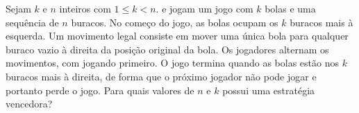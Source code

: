 Sejam $k$ e $n$ inteiros com $1\leq k<n$.  e  jogam um jogo com $k$ bolas e uma sequência de $n$ buracos. No começo do jogo, as bolas ocupam os $k$ buracos mais à esquerda. Um movimento legal consiste em mover uma única bola para qualquer buraco vazio à direita da posição original da bola. Os jogadores alternam os movimentos, com  jogando primeiro. O jogo termina quando as bolas estão nos $k$ buracos mais à direita, de forma que o próximo jogador não pode jogar e portanto perde o jogo. Para quais valores de $n$ e $k$  possui uma estratégia vencedora?
